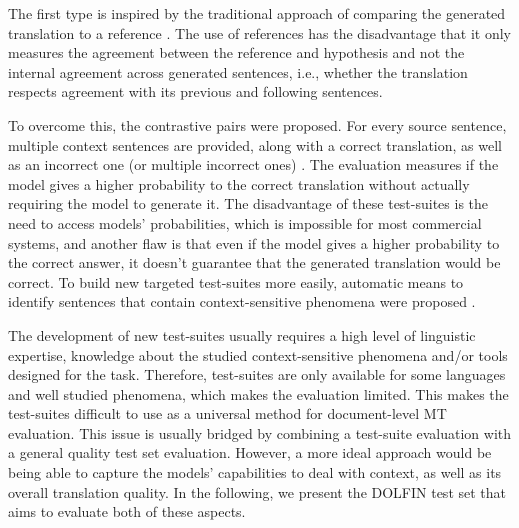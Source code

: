 The first type is inspired by the traditional approach of comparing the generated translation to a reference \cite{guillou-etal-2016-findings, wong-kit-2012-extending, hardmeier-federico-2010-modelling}.
The use of references has the disadvantage that it only measures the agreement between the reference and hypothesis and not the internal agreement across generated sentences, i.e., whether the translation respects agreement with its previous and following sentences.

To overcome this, the contrastive pairs were proposed. For every source sentence, multiple context sentences are provided, along with a correct translation, as well as an incorrect one (or multiple incorrect ones) \cite{bawden-etal-2018-evaluating, muller-etal-2018-large, voita-etal-2019-good}. The evaluation measures if the model gives a higher probability to the correct translation without actually requiring the model to generate it. The disadvantage of these test-suites is the need to access models' probabilities, which is impossible for most commercial systems, and another flaw is that even if the model gives a higher probability to the correct answer, it doesn't guarantee that the generated translation would be correct. 
To build new targeted test-suites more easily, automatic means to identify sentences that contain context-sensitive phenomena were proposed  \cite{fernandes-etal-2023-translation, wicks-post-2023-identifying}.

The development of new test-suites usually requires a high level of linguistic expertise, knowledge about the studied context-sensitive phenomena and/or tools designed for the task. Therefore, test-suites are only available for some languages and well studied phenomena, which makes the evaluation limited. This makes the test-suites difficult to use as a universal method for document-level MT evaluation. This issue is usually bridged by combining a test-suite evaluation with a general quality test set evaluation. However, a more ideal approach would be being able to capture the models' capabilities to deal with context, as well as its overall translation quality. 
In the following, we present the DOLFIN test set that aims to evaluate both of these aspects.